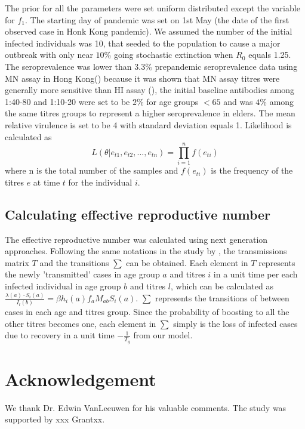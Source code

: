 \documentclass{article}
\begin{document}
The prior for all the parameters were set uniform distributed except the variable for $f_{1}$. The starting day of pandemic was set on 1st May (the date of the first observed case in Honk Kong pandemic). We assumed the number of the initial infected individuals was 10, that seeded to the population to cause a major outbreak with only near $10\%$ going stochastic extinction when $R_{0}$ equals 1.25. The seroprevalence was lower than $3.3\%$ prepandemic seroprevalence data using MN assay in Hong Kong(\cite{Wu2014}) because it was shown that MN assay titres were generally more sensitive than HI assay  (\cite{Grund2011}), the initial baseline antibodies among 1:40-80 and 1:10-20 were set to be $2\%$ for age groups $<65$ and was $4\%$ among the same titres groups to represent a higher seroprevalence in elders. The mean relative virulence is set to be 4 with standard deviation equals 1. Likelihood is calculated as
\begin{equation}
  L(\theta|e_{t1},e_{t2},...,e_{tn})=\prod_{i=1}^{n} f(e_{ti})
\end{equation}
where n is the total number of the samples and $f(e_{ti})$ is the frequency of the titres $e$ at time $t$ for the individual $i$.

\clearpage
\subsection{Calculating effective reproductive number}
The effective reproductive number was calculated using next generation approaches. Following the same notations in the study by \cite{Diekmann2010}, the transmissions matrix $T$ and the transitions $\sum$ can be obtained. Each element in $T$ represents the newly 'transmitted' cases in age group $a$ and titres $i$ in a unit time per each infected individual in age group $b$ and titres $l$, which can be calculated as   $  \frac{\lambda(a) \cdot S_{i}(a)}{I_{l}(b)} = \beta h_{i}(a) f_{a} M_{ab}S_{i}(a)$. $\sum$ represents the transitions of between cases in each age and titres group. Since the probability of boosting to all the other titres becomes one, each element in $\sum$ simply is the loss of infected cases due to recovery in a unit time $-\frac{1}{T_{g}}$ from our model.



\pagebreak
\section{Acknowledgement}
We thank Dr. Edwin VanLeeuwen for his valuable comments. The study was supported by xxx Grantxx.
\end{document}

